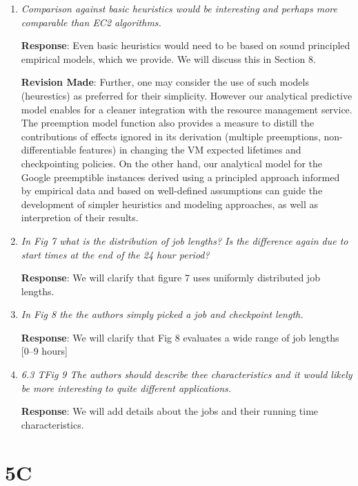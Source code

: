 \documentclass{article}
\newcommand{\resp}[1]{\textbf{Response}: #1}
\newcommand{\revmade}[1]{\textbf{Revision Made}: #1}
\begin{document}
\begin{enumerate}
\item \emph{Comparison against basic heuristics would be interesting and perhaps more comparable than EC2 algorithms.}

\resp{Even basic heuristics would need to be based on sound principled empirical models, which we provide. We will discuss this in Section 8.}

\revmade{Further, one may consider the use of such models (heurestics) as preferred for their simplicity. However our analytical predictive model enables for a cleaner integration with the resource management service. The preemption model function also provides a measure to distill the contributions of effects ignored in its derivation (multiple preemptions, non-differentiable features) in changing the VM expected lifetimes and checkpointing policies. On the other hand, our analytical model for the Google preemptible instances derived using a principled approach informed by empirical data and based on well-defined assumptions can guide the development of simpler heuristics and modeling approaches, as well as interpretion of their results.}

\item \emph{In Fig 7 what is the distribution of job lengths? Is the difference again due to start times at the end of the 24 hour period?}

\resp{We will clarify that figure 7 uses uniformly distributed job lengths.}


\item \emph{In Fig 8 the the authors simply picked a job and checkpoint length.}

\resp{We will clarify that Fig 8 evaluates a wide range of job lengths [0--9 hours]}


\item \emph{6.3 TFig 9 The authors should describe thee characteristics and it would likely be more interesting to quite different applications.}

\resp{We will add details about the jobs and their running time characteristics.}


\end{enumerate}

\section{5C}
\end{document}
